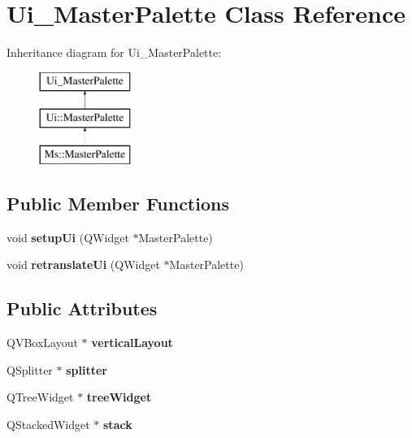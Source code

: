 \hypertarget{class_ui___master_palette}{}\section{Ui\+\_\+\+Master\+Palette Class Reference}
\label{class_ui___master_palette}
Inheritance diagram for Ui\+\_\+\+Master\+Palette\+:\begin{figure}[H]
\begin{center}
\leavevmode
\includegraphics[height=3.000000cm]{class_ui___master_palette}
\end{center}
\end{figure}
\subsection*{Public Member Functions}
\begin{DoxyCompactItemize}
\item 
\mbox{\label{class_ui___master_palette_a7608e55d99d3095fc1e0c41db6ed637b}} 
void {\bfseries setup\+Ui} (Q\+Widget $\ast$Master\+Palette)
\item 
\mbox{\label{class_ui___master_palette_a2dd9e30782abba0185b2ccfa42d673cb}} 
void {\bfseries retranslate\+Ui} (Q\+Widget $\ast$Master\+Palette)
\end{DoxyCompactItemize}
\subsection*{Public Attributes}
\begin{DoxyCompactItemize}
\item 
\mbox{\label{class_ui___master_palette_ac178fadddbbfba38ac8ec7e27e36a164}} 
Q\+V\+Box\+Layout $\ast$ {\bfseries vertical\+Layout}
\item 
\mbox{\label{class_ui___master_palette_ac92316dfaab3cf39a97440d15b3b0563}} 
Q\+Splitter $\ast$ {\bfseries splitter}
\item 
\mbox{\label{class_ui___master_palette_a52c333d6bf73e156697b0c4b973093dd}} 
Q\+Tree\+Widget $\ast$ {\bfseries tree\+Widget}
\item 
\mbox{\label{class_ui___master_palette_a4d44a3cc1c53734acf31d38e1fd59491}} 
Q\+Stacked\+Widget $\ast$ {\bfseries stack}
\end{DoxyCompactItemize}


